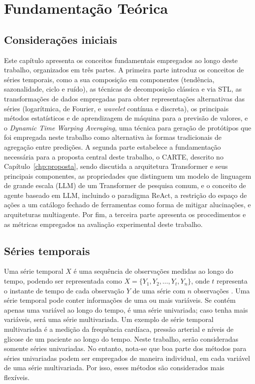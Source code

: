 \chapter{Fundamentação Teórica}\label{chp:background}
\section{Considerações iniciais}

Este capítulo apresenta os conceitos fundamentais empregados ao longo deste trabalho, organizados em três partes. A primeira parte introduz os conceitos de séries temporais, como a sua composição em componentes (tendência, sazonalidade, ciclo e ruído), as técnicas de decomposição clássica e via STL, as transformações de dados empregadas para obter representações alternativas das séries (logarítmica, de Fourier, e \textit{wavelet} contínua e discreta), os principais métodos estatísticos e de aprendizagem de máquina para a previsão de valores, e o \textit{Dynamic Time Warping Averaging}, uma técnica para geração de protótipos que foi empregada neste trabalho como alternativa às formas tradicionais de agregação entre predições. A segunda parte estabelece a fundamentação necessária para a proposta central deste trabalho, o CARTE, descrito no Capítulo~\ref{chp:proposta}, sendo discutida a arquitetura Transformer e seus principais componentes, as propriedades que distinguem um modelo de linguagem de grande escala (LLM) de um Transformer de pesquisa comum, e o conceito de agente baseado em LLM, incluindo o paradigma ReAct, a restrição do espaço de ações a um catálogo fechado de ferramentas como forma de mitigar alucinações, e arquiteturas multiagente. Por fim, a terceira parte apresenta os procedimentos e as métricas empregados na avaliação experimental deste trabalho.


\section{Séries temporais} 
Uma série temporal $X$ é uma sequência de observações medidas ao longo do tempo, podendo ser representada como $X = \{ Y_1, Y_2, \ldots, Y_t, Y_n \}$, onde $t$ representa o instante de tempo de cada observação $Y$ de uma série com $n$ observações \citep{cochrane1997}.
Uma série temporal pode conter informações de uma ou mais variáveis. Se contém apenas uma variável ao longo do tempo, é uma série univariada; caso tenha mais variáveis, será uma série multivariada. Um exemplo de série temporal multivariada é a medição da frequência cardíaca, pressão arterial e níveis de glicose de um paciente ao longo do tempo. Neste trabalho, serão consideradas somente séries univariadas. No entanto, nota-se que boa parte dos métodos para séries univariadas podem ser empregados de maneira individual, em cada variável de uma série multivariada. Por isso, esses métodos são considerados mais flexíveis.

